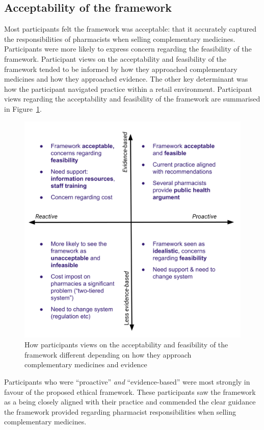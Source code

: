 \documentclass[12pt,]{article}
\begin{document}
\subsection{Acceptability of the framework}\label{acceptability}

Most participants felt the framework was acceptable: that it accurately
captured the responsibilities of pharmacists when selling complementary
medicines. Participants were more likely to express concern regarding
the feasibility of the framework. Participant views on the acceptability
and feasibility of the framework tended to be informed by how they
approached complementary medicines and how they approached evidence. The
other key determinant was how the participant navigated practice within
a retail environment. Participant views regarding the acceptability and
feasibility of the framework are summarised in Figure~\ref{accfeas}.

\begin{figure}
\centering
\includegraphics{files/CMEthics_accfeas.png}
\caption{How participants views on the acceptability and feasibility of
the framework different depending on how they approach complementary
medicines and evidence \label{accfeas}}
\end{figure}

Participants who were ``proactive'' \emph{and} ``evidence-based'' were
most strongly in favour of the proposed ethical framework. These
participants saw the framework as a being closely aligned with their
practice and commended the clear guidance the framework provided
regarding pharmacist responsibilities when selling complementary
medicines.
\end{document}
